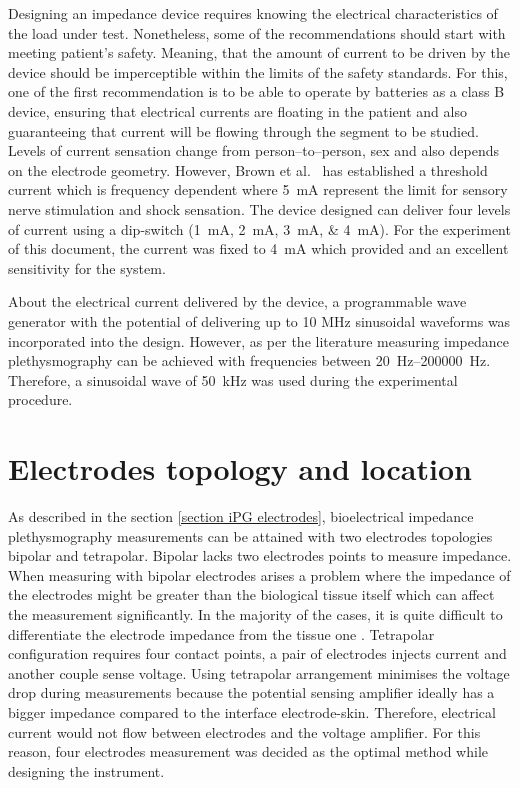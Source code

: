 Designing an impedance device requires knowing the electrical characteristics of the load under test. Nonetheless, some of the recommendations should start with meeting patient's safety. Meaning, that the amount of current to be driven by the device should be imperceptible within the limits of the safety standards. For this, one of the first recommendation is to be able to operate by batteries as a class B device, ensuring that electrical currents are floating in the patient and also guaranteeing that current will be flowing through the segment to be studied. Levels of current sensation change from person–to–person, sex and also depends on the electrode geometry. However, Brown et al.~\cite{brown1998medical} has established a threshold current which is frequency dependent where \SI{5}{\mA} represent the limit for sensory nerve stimulation and shock sensation. The device designed can deliver four levels of current using a dip-switch (\SIlist{1;2;3;4}{\mA}). For the experiment of this document, the current was fixed to \SI{4}{\mA} which provided and an excellent sensitivity for the system. 

About the electrical current delivered by the device, a programmable wave generator with the potential of delivering up to 10 MHz sinusoidal waveforms was incorporated into the design. However, as per the literature measuring impedance plethysmography can be achieved with frequencies between \SIrange[scientific-notation = engineering]{20}{200000}{\hertz}. Therefore, a sinusoidal wave of \SI{50}{\kilo\hertz} was used during the experimental procedure.

\section{Electrodes topology and location}
\label{section design electrodes}
As described in the section \ref{section iPG electrodes}, bioelectrical impedance plethysmography measurements can be attained with two electrodes topologies bipolar and tetrapolar. Bipolar lacks two electrodes points to measure impedance. When measuring with bipolar electrodes arises a problem where the impedance of the electrodes might be greater than the biological tissue itself which can affect the measurement significantly. In the majority of the cases, it is quite difficult to differentiate the electrode impedance from the tissue one \cite{brown2000bipolar}. Tetrapolar configuration requires four contact points, a pair of electrodes injects current and another couple sense voltage. Using tetrapolar arrangement minimises the voltage drop during measurements because the potential sensing amplifier ideally has a bigger impedance compared to the interface electrode-skin. Therefore, electrical current would not flow between electrodes and the voltage amplifier. For this reason, four electrodes measurement was decided as the optimal method while designing the instrument. 

